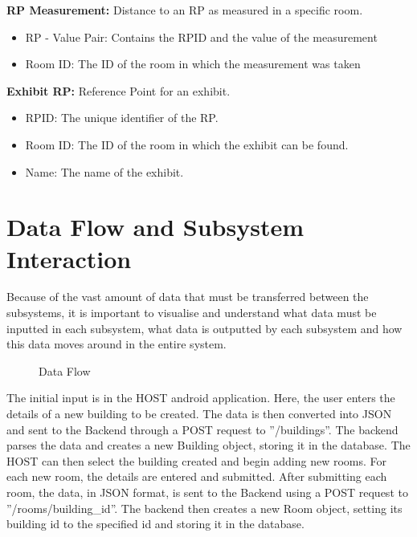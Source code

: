 \textbf{RP Measurement:} Distance to an RP as measured in a specific room.
\begin{itemize}
	\item RP - Value Pair: Contains the RPID and the value of the measurement
	\item Room ID: The ID of the room in which the measurement was taken
\end{itemize}

\textbf{Exhibit RP:} Reference Point for an exhibit.
\begin{itemize}
	\item RPID: The unique identifier of the RP.
	\item Room ID: The ID of the room in which the exhibit can be found.
	\item Name: The name of the exhibit.
\end{itemize}

\section{Data Flow and Subsystem Interaction}
Because of the vast amount of data that must be transferred between the subsystems, it is important to visualise and understand what data must be inputted in each subsystem, what data is outputted by each subsystem and how this data moves around in the entire system.
\begin{figure}
\noindent{}
\caption{Data Flow}
\end{figure}
The initial input is in the HOST android application. Here, the user enters the details of a new building to be created. The data is then converted into JSON and sent to the Backend through a POST request to ”/buildings”. The backend parses the data and creates a new Building object, storing it in the database. The HOST can then select the building created and begin adding new rooms. For each new room, the details are entered and submitted. After submitting each room, the data, in JSON format, is sent to the Backend using a POST request to ”/rooms/building\_id”. The backend then creates a new Room object, setting its building id to the specified id and storing it in the database.

